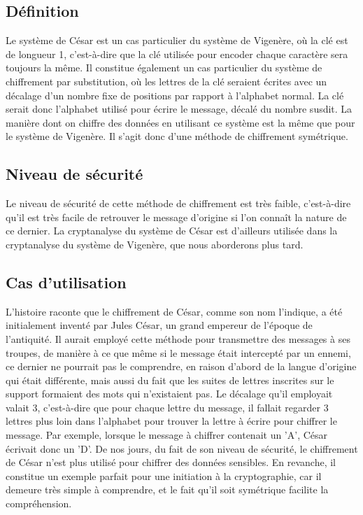 		\subsection{Définition}
			Le système de César est un cas particulier du système de Vigenère, où la clé est de longueur 1, c'est-à-dire que la clé utilisée pour encoder chaque caractère sera toujours la même. Il constitue également un cas particulier du système de chiffrement par substitution, où les lettres de la clé seraient écrites avec un décalage d'un nombre fixe de positions par rapport à l'alphabet normal. La clé serait donc l'alphabet utilisé pour écrire le message, décalé du nombre susdit.
			La manière dont on chiffre des données en utilisant ce système est la même que pour le système de Vigenère. Il s'agit donc d'une méthode de chiffrement symétrique.
		\subsection{Niveau de sécurité}
			Le niveau de sécurité de cette méthode de chiffrement est très faible, c'est-à-dire qu'il est très facile de retrouver le message d'origine si l'on connaît la nature de ce dernier. La cryptanalyse du système de César est d'ailleurs utilisée dans la cryptanalyse du système de Vigenère, que nous aborderons plus tard.
		\subsection{Cas d'utilisation}
			L'histoire raconte que le chiffrement de César, comme son nom l'indique, a été initialement inventé par Jules César, un grand empereur de l'époque de l'antiquité. Il aurait employé cette méthode pour transmettre des messages à ses troupes, de manière à ce que même si le message était intercepté par un ennemi, ce dernier ne pourrait pas le comprendre, en raison d'abord de la langue d'origine qui était différente, mais aussi du fait que les suites de lettres inscrites sur le support formaient des mots qui n'existaient pas. Le décalage qu'il employait valait 3, c'est-à-dire que pour chaque lettre du message, il fallait regarder 3 lettres plus loin dans l'alphabet pour trouver la lettre à écrire pour chiffrer le message. Par exemple, lorsque le message à chiffrer contenait un 'A', César écrivait donc un 'D'.
			De nos jours, du fait de son niveau de sécurité, le chiffrement de César n'est plus utilisé pour chiffrer des données sensibles. En revanche, il constitue un exemple parfait pour une initiation à la cryptographie, car il demeure très simple à comprendre, et le fait qu'il soit symétrique facilite la compréhension.
